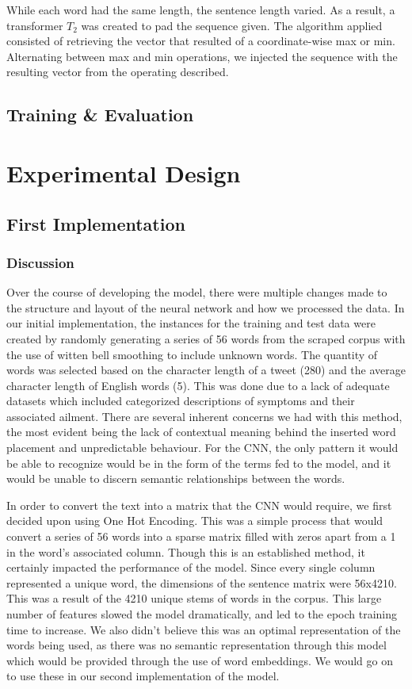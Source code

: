 \documentclass[12pt]{report}
\begin{document}
While each word had the same length, the sentence length varied. As a result,
a transformer $T_2$ was created to pad the sequence given. The algorithm
applied consisted of retrieving the vector that resulted of a coordinate-wise
max or min. Alternating between max and min operations, we injected the sequence
with the resulting vector from the operating described.

\section{Training \& Evaluation}

\chapter{Experimental Design}

\section{First Implementation}

\subsection{Discussion}
Over the course of developing the model, there were multiple changes made to the 
structure and layout of the neural network and how we processed the data. In our 
initial implementation, the instances for the training and test data were created 
by randomly generating a series of 56 words from the scraped corpus with the use 
of witten bell smoothing to include unknown words. The quantity of words was selected 
based on the character length of a tweet (280) and the average character length of 
English words (5). This was done due to a lack of adequate datasets which included 
categorized descriptions of symptoms and their associated ailment. There are several 
inherent concerns we had with this method, the most evident being the lack of contextual 
meaning behind the inserted word placement and unpredictable behaviour. For the CNN, the 
only pattern it would be able to recognize would be in the form of the terms fed to the 
model, and it would be unable to discern semantic relationships between the words.

In order to convert the text into a matrix that the CNN would require, we first decided 
upon using One Hot Encoding. This was a simple process that would convert a series of 56 
words into a sparse matrix filled with zeros apart from a 1 in the word’s associated column. 
Though this is an established method, it certainly impacted the performance of the model. 
Since every single column represented a unique word, the dimensions of the sentence matrix 
were 56x4210. This was a result of the 4210 unique stems of words in the corpus. This large 
number of features slowed the model dramatically, and led to the epoch training time to increase. 
We also didn’t believe this was an optimal representation of the words being used, as there was 
no semantic representation through this model which would be provided through the use of word 
embeddings. We would go on to use these in our second implementation of the model.
\end{document}
